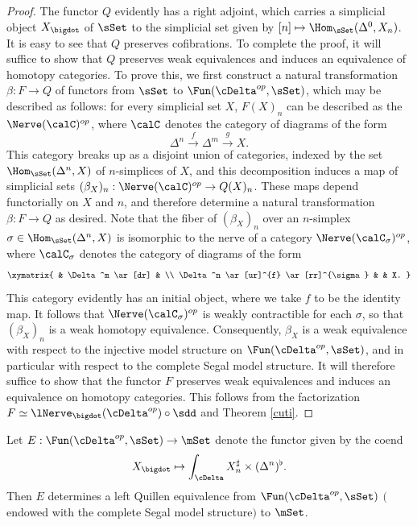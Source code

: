 \begin{proof}
The functor $Q$ evidently has a right adjoint, which carries a simplicial object
$X_{\bigdot}$ of $\sSet$ to the simplicial set given by $[n] \mapsto \Hom_{\sSet}(\Delta^0, X_{n} )$.
It is easy to see that $Q$ preserves cofibrations. To complete the proof, it will suffice to show that
$Q$ preserves weak equivalences and induces an equivalence of homotopy categories.
To prove this, we first construct a natural transformation $\beta: F \rightarrow Q$
of functors from $\sSet$ to $\Fun( \cDelta^{op}, \sSet)$, which may be described as follows:
for every simplicial set $X$, $F(X)_{n}$ can be described as the $\Nerve( \calC)^{op}$, where
$\calC$ denotes the category of diagrams of the form
$$ \Delta^n \stackrel{f}{\rightarrow} \Delta^m \stackrel{g}{\rightarrow} X.$$
This category breaks up as a disjoint union of categories, indexed by the set
$\Hom_{\sSet}( \Delta^n, X)$ of $n$-simplices of $X$, and this decomposition induces a map of simplicial sets $(\beta_X)_n: \Nerve(\calC)^{op} \rightarrow Q(X)_n$. These maps depend functorially on $X$ and $n$, and therefore determine a natural transformation $\beta: F \rightarrow Q$
as desired. Note that the fiber of $(\beta_X)_n$ over an $n$-simplex $\sigma \in \Hom_{\sSet}( \Delta^n, X)$ is isomorphic to the nerve of a category $\Nerve( \calC_{\sigma})^{op}$, where
$\calC_{\sigma}$ denotes the category of diagrams of the form
$$ \xymatrix{ & \Delta^m \ar[dr] & \\
\Delta^n \ar[ur]^{f} \ar[rr]^{\sigma} & & X. }$$
This category evidently has an initial object, where we take $f$ to be the identity map.
It follows that $\Nerve( \calC_{\sigma})^{op}$ is weakly contractible for each $\sigma$, so that
$(\beta_X)_n$ is a weak homotopy equivalence. Consequently, $\beta_X$ is a weak
equivalence with respect to the injective model structure on $\Fun( \cDelta^{op}, \sSet)$, and in particular with respect to the complete Segal model structure. It will therefore suffice to show
that the functor $F$ preserves weak equivalences and induces an equivalence on homotopy categories. This follows from the factorization $F \simeq \lNerve_{\bigdot}( \cDelta^{op} ) \circ \sdd$ and
Theorem \ref{cuti}.
\end{proof}

\begin{corollary}\label{dumont}
Let $E: \Fun( \cDelta^{op}, \sSet) \rightarrow \mSet$ denote the functor given by the coend
$$ X_{\bigdot} \mapsto \int_{ \cDelta} X_{n}^{\sharp} \times (\Delta^n)^{\flat}.$$
Then $E$ determines a left Quillen equivalence from $\Fun( \cDelta^{op}, \sSet)$ 
$($endowed with the complete Segal model structure$)$ to $\mSet$.
\end{corollary}

